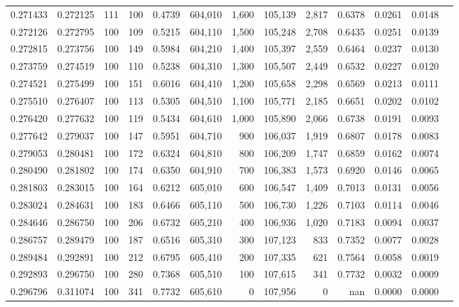 \begin{tabular}{rrrrrrrrrrrrr}
0.271433 & 0.272125 &   111 & 100 &                                     0.4739 & 604,010 &   1,600 & 105,139 &   2,817 & 0.6378 & 0.0261 & 0.0148 \\
0.272126 & 0.272795 &   100 & 109 &                                     0.5215 & 604,110 &   1,500 & 105,248 &   2,708 & 0.6435 & 0.0251 & 0.0139 \\
0.272815 & 0.273756 &   100 & 149 &                                     0.5984 & 604,210 &   1,400 & 105,397 &   2,559 & 0.6464 & 0.0237 & 0.0130 \\
0.273759 & 0.274519 &   100 & 110 &                                     0.5238 & 604,310 &   1,300 & 105,507 &   2,449 & 0.6532 & 0.0227 & 0.0120 \\
0.274521 & 0.275499 &   100 & 151 &                                     0.6016 & 604,410 &   1,200 & 105,658 &   2,298 & 0.6569 & 0.0213 & 0.0111 \\
0.275510 & 0.276407 &   100 & 113 &                                     0.5305 & 604,510 &   1,100 & 105,771 &   2,185 & 0.6651 & 0.0202 & 0.0102 \\
0.276420 & 0.277632 &   100 & 119 &                                     0.5434 & 604,610 &   1,000 & 105,890 &   2,066 & 0.6738 & 0.0191 & 0.0093 \\
0.277642 & 0.279037 &   100 & 147 &                                     0.5951 & 604,710 &     900 & 106,037 &   1,919 & 0.6807 & 0.0178 & 0.0083 \\
0.279053 & 0.280481 &   100 & 172 &                                     0.6324 & 604,810 &     800 & 106,209 &   1,747 & 0.6859 & 0.0162 & 0.0074 \\
0.280490 & 0.281802 &   100 & 174 &                                     0.6350 & 604,910 &     700 & 106,383 &   1,573 & 0.6920 & 0.0146 & 0.0065 \\
0.281803 & 0.283015 &   100 & 164 &                                     0.6212 & 605,010 &     600 & 106,547 &   1,409 & 0.7013 & 0.0131 & 0.0056 \\
0.283024 & 0.284631 &   100 & 183 &                                     0.6466 & 605,110 &     500 & 106,730 &   1,226 & 0.7103 & 0.0114 & 0.0046 \\
0.284646 & 0.286750 &   100 & 206 &                                     0.6732 & 605,210 &     400 & 106,936 &   1,020 & 0.7183 & 0.0094 & 0.0037 \\
0.286757 & 0.289479 &   100 & 187 &                                     0.6516 & 605,310 &     300 & 107,123 &     833 & 0.7352 & 0.0077 & 0.0028 \\
0.289484 & 0.292891 &   100 & 212 &                                     0.6795 & 605,410 &     200 & 107,335 &     621 & 0.7564 & 0.0058 & 0.0019 \\
0.292893 & 0.296750 &   100 & 280 &                                     0.7368 & 605,510 &     100 & 107,615 &     341 & 0.7732 & 0.0032 & 0.0009 \\
0.296796 & 0.311074 &   100 & 341 &                                     0.7732 & 605,610 &       0 & 107,956 &       0 &    nan & 0.0000 & 0.0000 \\
\bottomrule
\end{tabular}
